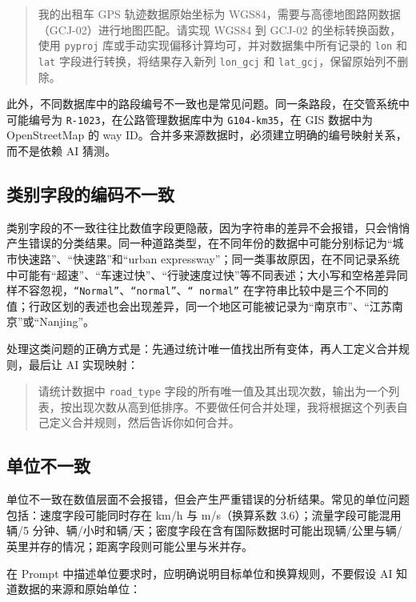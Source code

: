 \begin{quote}
我的出租车 GPS 轨迹数据原始坐标为 WGS84，需要与高德地图路网数据（GCJ-02）进行地图匹配。请实现 WGS84 到 GCJ-02 的坐标转换函数，使用 \texttt{pyproj} 库或手动实现偏移计算均可，并对数据集中所有记录的 \texttt{lon} 和 \texttt{lat} 字段进行转换，将结果存入新列 \texttt{lon\_gcj} 和 \texttt{lat\_gcj}，保留原始列不删除。
\end{quote}

此外，不同数据库中的路段编号不一致也是常见问题。同一条路段，在交管系统中可能编号为 \texttt{R-1023}，在公路管理数据库中为 \texttt{G104-km35}，在 GIS 数据中为 OpenStreetMap 的 way ID。合并多来源数据时，必须建立明确的编号映射关系，而不是依赖 AI 猜测。

\subsection{类别字段的编码不一致}

类别字段的不一致往往比数值字段更隐蔽，因为字符串的差异不会报错，只会悄悄产生错误的分类结果。同一种道路类型，在不同年份的数据中可能分别标记为“城市快速路”、“快速路”和“urban expressway”；同一类事故原因，在不同记录系统中可能有“超速”、“车速过快”、“行驶速度过快”等不同表述；大小写和空格差异同样不容忽视，\texttt{“Normal”}、\texttt{“normal”}、\texttt{“ normal”} 在字符串比较中是三个不同的值；行政区划的表述也会出现差异，同一个地区可能被记录为“南京市”、“江苏南京”或“Nanjing”。

处理这类问题的正确方式是：先通过统计唯一值找出所有变体，再人工定义合并规则，最后让 AI 实现映射：

\begin{quote}
请统计数据中 \texttt{road\_type} 字段的所有唯一值及其出现次数，输出为一个列表，按出现次数从高到低排序。不要做任何合并处理，我将根据这个列表自己定义合并规则，然后告诉你如何合并。
\end{quote}

\subsection{单位不一致}

单位不一致在数值层面不会报错，但会产生严重错误的分析结果。常见的单位问题包括：速度字段可能同时存在 km/h 与 m/s（换算系数 3.6）；流量字段可能混用辆/5 分钟、辆/小时和辆/天；密度字段在含有国际数据时可能出现辆/公里与辆/英里并存的情况；距离字段则可能公里与米并存。

在 Prompt 中描述单位要求时，应明确说明目标单位和换算规则，不要假设 AI 知道数据的来源和原始单位：


